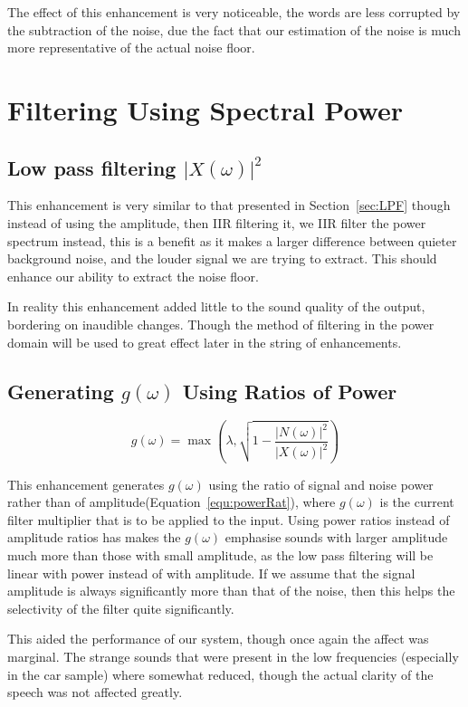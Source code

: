 \documentclass[11pt]{article} %
\begin{document}
{The effect of this enhancement is very noticeable, the words are less corrupted by the subtraction of the noise, due the fact that our estimation of the noise is much more representative of the actual noise floor.   
\section{Filtering Using Spectral Power} 
\subsection{Low pass filtering $\lvert X(\omega) \rvert^{2} $} 

This enhancement is very similar to that presented in Section~\ref{sec:LPF} though instead of using the amplitude, then IIR filtering it, we IIR filter the power spectrum instead, this is a benefit as it makes a larger difference between quieter background noise, and the louder signal we are trying to extract. This should enhance our ability to extract the noise floor. 

In reality this enhancement added little to the sound quality of the output, bordering on inaudible changes. Though the method of filtering in the power domain will be used to great effect later in the string of enhancements.  

\subsection{Generating $g(\omega)$ Using Ratios of Power} 
\label{sec:powerrat}
\begin{equation}
\label{equ:powerRat}
	g(\omega) = \max\left(\lambda, \sqrt{1- \frac{\lvert N(\omega) \rvert ^{2}}{\lvert X(\omega) \rvert ^{2}}}\right)
\end{equation}

This enhancement generates $g(\omega)$ using the ratio of signal and noise power rather than of amplitude(Equation~\ref{equ:powerRat}), where $g(\omega)$ is the current filter multiplier that is to be applied to the input. Using power ratios instead of amplitude ratios has makes the $g(\omega)$ emphasise sounds with larger amplitude much more than those with small amplitude, as the low pass filtering will be linear with power instead of with amplitude. If we assume that the signal amplitude is always significantly more than that of the noise, then this helps the selectivity of the filter quite significantly.

This aided the performance of our system, though once again the affect was marginal. The strange sounds that were present in the low frequencies (especially in the car sample) where somewhat reduced, though the actual clarity of the speech was not affected greatly.

}
\end{document}
